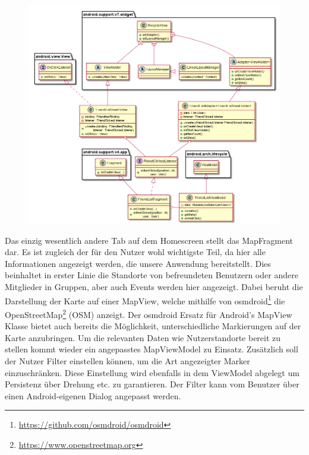 \documentclass[parskip=full,11pt]{scrartcl}
\begin{document}
\begin{figure}
    \centering
    \includegraphics[width = \columnwidth]{lists.png}
	\label{fig:lists}
\end{figure}

Das einzig wesentlich andere Tab auf dem Homescreen stellt das MapFragment dar. 
Es ist zugleich der für den Nutzer wohl wichtigste Teil, da hier alle 
Informationen angezeigt werden, die unsere Anwendung bereitstellt. Dies 
beinhaltet in erster Linie die Standorte von befreundeten Benutzern oder andere 
Mitglieder in Gruppen, aber auch Events werden hier angezeigt. Dabei beruht die 
Darstellung der Karte auf einer MapView, welche mithilfe von 
osmdroid\footnote{\url{https://github.com/osmdroid/osmdroid}} die
OpenStreetMap\footnote{\url{https://www.openstreetmap.org}} (OSM) anzeigt. 
Der osmdroid Ersatz für Android's MapView Klasse bietet auch bereits die 
Möglichkeit, unterschiedliche Markierungen auf der Karte anzubringen. Um die 
relevanten Daten wie Nutzerstandorte bereit zu stellen kommt wieder ein angepasstes 
MapViewModel zu Einsatz. Zusätzlich soll der Nutzer Filter einstellen können, 
um die Art angezeigter Marker einzuschränken. Diese Einstellung wird ebenfalls 
in dem ViewModel abgelegt um Persistenz über Drehung etc. zu garantieren. Der 
Filter kann vom Benutzer über einen Android-eigenen Dialog angepasst werden.
\end{document}
